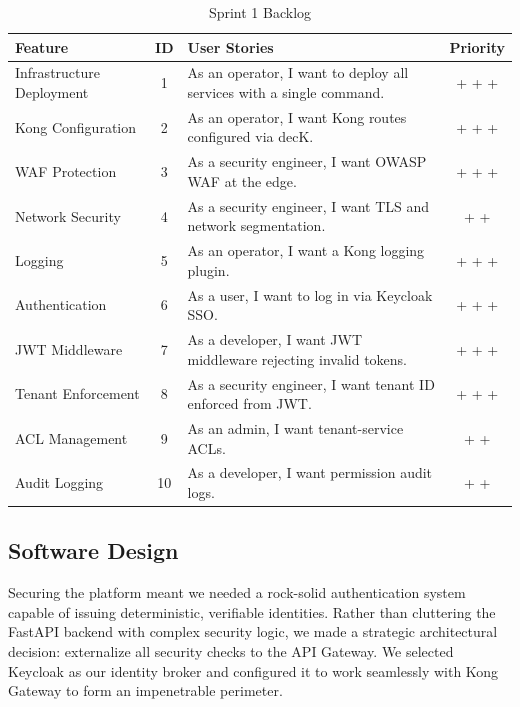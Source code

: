 \begin{table}[H]
\centering
\renewcommand{\arraystretch}{1.3}
\footnotesize
\begin{tabularx}{\textwidth}{| >{\raggedright\arraybackslash}p{3.5cm} | c | >{\raggedright\arraybackslash}X | c |}
\hline
\rowcolor{rowgray}
\textbf{Feature} & \textbf{ID} & \textbf{User Stories} & \textbf{Priority} \\
\hline
Infrastructure Deployment & 1 & As an operator, I want to deploy all services with a single command. & + + + \\
\hline
Kong Configuration & 2 & As an operator, I want Kong routes configured via decK. & + + + \\
\hline
WAF Protection & 3 & As a security engineer, I want OWASP WAF at the edge. & + + + \\
\hline
Network Security & 4 & As a security engineer, I want TLS and network segmentation. & + + \\
\hline
Logging & 5 & As an operator, I want a Kong logging plugin. & + + + \\
\hline
Authentication & 6 & As a user, I want to log in via Keycloak SSO. & + + + \\
\hline
JWT Middleware & 7 & As a developer, I want JWT middleware rejecting invalid tokens. & + + + \\
\hline
Tenant Enforcement & 8 & As a security engineer, I want tenant ID enforced from JWT. & + + + \\
\hline
ACL Management & 9 & As an admin, I want tenant-service ACLs. & + + \\
\hline
Audit Logging & 10 & As a developer, I want permission audit logs. & + + \\
\hline
\end{tabularx}
\caption{Sprint 1 Backlog}
\label{tab:sprint1_backlog}
\end{table}

\subsection{Software Design}

Securing the platform meant we needed a rock-solid authentication system capable of issuing deterministic, verifiable identities. Rather than cluttering the FastAPI backend with complex security logic, we made a strategic architectural decision: externalize all security checks to the API Gateway. We selected Keycloak as our identity broker and configured it to work seamlessly with Kong Gateway to form an impenetrable perimeter.


